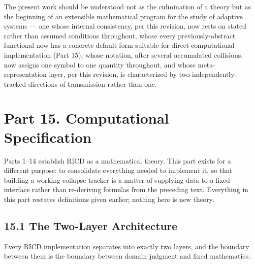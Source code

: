 \documentclass[
]{article}
\begin{document}
The present work should be understood not as the culmination of a theory
but as the beginning of an extensible mathematical program for the study
of adaptive systems --- one whose internal consistency, per this
revision, now rests on stated rather than assumed conditions throughout,
whose every previously-abstract functional now has a concrete default
form suitable for direct computational implementation (Part 15), whose
notation, after several accumulated collisions, now assigns one symbol
to one quantity throughout, and whose meta-representation layer, per
this revision, is characterized by two independently-tracked directions
of transmission rather than one.

\hypertarget{part-15.-computational-specification}{%
\section{Part 15. Computational
Specification}\label{part-15.-computational-specification}}

Parts 1--14 establish RICD as a mathematical theory. This part exists
for a different purpose: to consolidate everything needed to implement
it, so that building a working collapse tracker is a matter of supplying
data to a fixed interface rather than re-deriving formulas from the
preceding text. Everything in this part restates definitions given
earlier; nothing here is new theory.

\hypertarget{the-two-layer-architecture}{%
\subsection{15.1 The Two-Layer
Architecture}\label{the-two-layer-architecture}}

Every RICD implementation separates into exactly two layers, and the
boundary between them is the boundary between domain judgment and fixed
mathematics:
\end{document}
